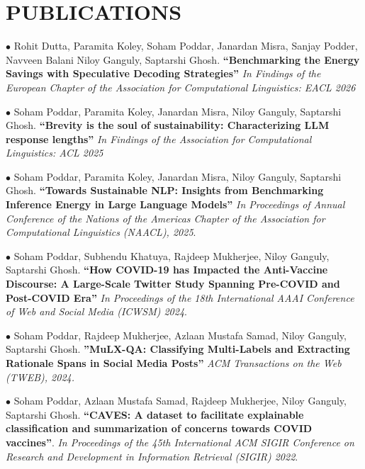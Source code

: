 \documentclass[paper=a4,fontsize=10pt]{scrartcl} %
\newcommand{\sepspace}{\vspace*{0.6em}}		%
\newcommand{\NewPart}[1]{\section*{\uppercase{#1}}}
\begin{document}
\NewPart{Publications}{}

\vspace*{-1mm}

{
\small
    \noindent $\bullet$ Rohit Dutta, Paramita Koley, Soham Poddar, Janardan Misra, Sanjay Podder, Navveen Balani Niloy Ganguly, Saptarshi Ghosh. 
    \textbf{``Benchmarking the Energy Savings with Speculative Decoding Strategies''} 
    \textit{In Findings of the European Chapter of the Association for Computational Linguistics: EACL 2026}
    \newpage

    \noindent $\bullet$ Soham Poddar, Paramita Koley, Janardan Misra, Niloy Ganguly, Saptarshi Ghosh. 
    \textbf{``Brevity is the soul of sustainability: Characterizing LLM response lengths''} 
    \textit{In Findings of the Association for Computational Linguistics: ACL 2025}
    \sepspace

    
    \noindent $\bullet$ Soham Poddar, Paramita Koley, Janardan Misra, Niloy Ganguly, Saptarshi Ghosh. \textbf{``Towards Sustainable NLP: Insights from Benchmarking Inference Energy in Large Language Models''} \textit{In Proceedings of Annual Conference of the Nations of the Americas Chapter of the Association for Computational Linguistics (NAACL), 2025}. 
    \sepspace

    
    
    \noindent $\bullet$ Soham Poddar, Subhendu Khatuya, Rajdeep Mukherjee, Niloy Ganguly, Saptarshi Ghosh. \textbf{``How COVID-19 has Impacted the Anti-Vaccine Discourse: A Large-Scale Twitter Study Spanning Pre-COVID and Post-COVID Era''} \textit{In Proceedings of the 18th International AAAI Conference of Web and Social Media (ICWSM) 2024}. 
    \sepspace

    

    \noindent $\bullet$ Soham Poddar, Rajdeep Mukherjee, Azlaan Mustafa Samad, Niloy Ganguly, Saptarshi Ghosh. \textbf{''MuLX-QA: Classifying Multi-Labels and Extracting Rationale Spans in Social Media Posts''} \textit{ACM Transactions on the Web (TWEB), 2024.} 
    \sepspace



    \noindent $\bullet$ Soham Poddar, Azlaan Mustafa Samad, Rajdeep Mukherjee, Niloy Ganguly, Saptarshi Ghosh. \textbf{``CAVES: A dataset to facilitate explainable classification and summarization of concerns towards COVID vaccines''}. \textit{In Proceedings of the 45th International ACM SIGIR Conference on Research and Development in Information Retrieval (SIGIR) 2022}. 
    \sepspace
    
}
\end{document}
